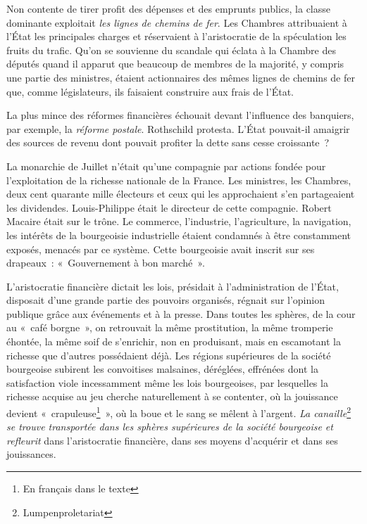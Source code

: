 \documentclass[french,twoside]{book} %
\begin{document}
Non contente de tirer profit des dépenses et des emprunts publics, la classe dominante exploitait \emph{les lignes de chemins de fer}. Les Chambres attribuaient à l’État les principales charges et réservaient à l’aristocratie de la spéculation les fruits du trafic. Qu’on se souvienne du scandale qui éclata à la Chambre des députés quand il apparut que beaucoup de membres de la majorité, y compris une partie des ministres, étaient actionnaires des mêmes lignes de chemins de fer que, comme législateurs, ils faisaient construire aux frais de l’État.\par
La plus mince des réformes financières échouait devant l’influence des banquiers, par exemple, la \emph{réforme postale}. Rothschild protesta. L’État pouvait-il amaigrir des sources de revenu dont pouvait profiter la dette sans cesse croissante ?\par
La monarchie de Juillet n’était qu’une compagnie par actions fondée pour l’exploitation de la richesse nationale de la France. Les ministres, les Chambres, deux cent quarante mille électeurs et ceux qui les approchaient s’en partageaient les dividendes. Louis-Philippe était le directeur de cette compagnie. Robert Macaire était sur le trône. Le commerce, l’industrie, l’agriculture, la navigation, les intérêts de la bourgeoisie industrielle étaient condamnés à être constamment exposés, menacés par ce système. Cette bourgeoisie avait inscrit sur ses drapeaux : « Gouvernement à bon marché ».\par
L’aristocratie financière dictait les lois, présidait à l’administration de l’État, disposait d’une grande partie des pouvoirs organisés, régnait sur l’opinion publique grâce aux événements et à la presse. Dans toutes les sphères, de la cour au « café borgne », on retrouvait la même prostitution, la même tromperie éhontée, la même soif de s’enrichir, non en produisant, mais en escamotant la richesse que d’autres possédaient déjà. Les régions supérieures de la société bourgeoise subirent les convoitises malsaines, déréglées, effrénées dont la satisfaction viole incessamment même les lois bourgeoises, par lesquelles la richesse acquise au jeu cherche naturellement à se contenter, où la jouissance devient « crapuleuse\footnote{En français dans le texte} », où la boue et le sang se mêlent à l’argent. \emph{La canaille}\footnote{Lumpenproletariat}\emph{ se trouve transportée dans les sphères supérieures de la société bourgeoise et refleurit} dans l’aristocratie financière, dans ses moyens d’acquérir et dans ses jouissances.\par
\end{document}
